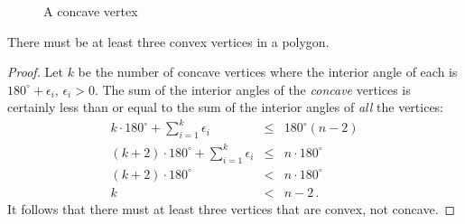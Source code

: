 \begin{figure}[t]
\begin{center}
\end{center}
\caption{A concave vertex}\label{f.museum.concave}
\end{figure}


\begin{theorem}\label{thm.convex}
There must be at least three convex vertices in a polygon.
\end{theorem}

\begin{proof} Let $k$ be the number of concave vertices where the interior angle of each is $180^\circ+\epsilon_i$, $\epsilon_i>0$. The sum of the interior angles of the \emph{concave} vertices is certainly less than or equal to the sum of the interior angles of \emph{all} the vertices:
%
\begin{eqnarray*}
k\cdot 180^\circ +\displaystyle\sum_{i=1}^{k}\epsilon_i &\leq& 180^\circ(n-2)\\
(k+2)\cdot 180^\circ +\displaystyle\sum_{i=1}^{k}\epsilon_i &\leq& n\cdot 180^\circ\\
(k+2)\cdot 180^\circ &<& n\cdot 180^\circ\\
k&<&n-2\,.
\end{eqnarray*}
It follows that there must at least three vertices that are convex, not concave.
\end{proof}

